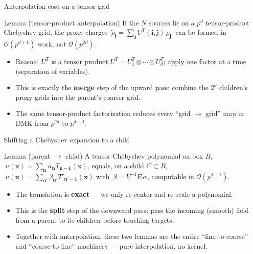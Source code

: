 \documentclass[aspectratio=169,11pt]{beamer}
\newcommand{\cO}{\mathcal{O}}
\newcommand{\x}{\bm{x}}
\newcommand{\hl}[1]{{\color{CCMorange}\textbf{#1}}}
\begin{document}
\begin{frame}{Anterpolation cost on a tensor grid}
\small
\begin{block}{Lemma (tensor-product anterpolation)}
If the \(N\) sources lie on a \(p^d\) tensor-product Chebyshev grid, the proxy charges
\(\ \tilde\rho_{\bm i}=\sum_{\bm j} U^{T}(\bm i,\bm j)\,\rho_{\bm j}\ \)
can be formed in \(\cO(p^{d+1})\) work, not \(\cO(p^{2d})\).
\end{block}
\begin{itemize}
  \item Reason: \(U^T\) is a tensor product \(U^T=U_1^T\otimes\cdots\otimes U_d^T\); apply one factor at a time (separation of variables).
  \item This is exactly the \hl{merge} step of the upward pass: combine the \(2^d\) children's proxy grids into the parent's coarser grid.
  \item The same tensor-product factorization reduces every ``grid \(\to\) grid'' map in DMK from \(p^{2d}\) to \(p^{d+1}\).
\end{itemize}
\end{frame}

\begin{frame}{Shifting a Chebyshev expansion to a child}
\small
\begin{block}{Lemma (parent \(\to\) child)}
A tensor Chebyshev polynomial on box \(B\), \(\ u(\x)=\sum_{\bm n}\alpha_{\bm n}T_{\bm n-\bm1}(\x)\), equals, on a child \(C\subset B\), \(\ u(\x)=\sum_{\bm n'}\beta_{\bm n'}T'_{\bm n'-\bm1}(\x)\) with
\(\ \beta=V^{-1}E\,\alpha\), computable in \(\cO(p^{d+1})\).
\end{block}
\begin{itemize}
  \item The translation is \hl{exact} --- we only re-center and re-scale a polynomial.
  \item This is the \hl{split} step of the downward pass: pass the incoming (smooth) field from a parent to its children before touching targets.
  \item Together with anterpolation, these two lemmas are the entire ``fine-to-coarse'' and ``coarse-to-fine'' machinery --- pure interpolation, no kernel.
\end{itemize}
\end{frame}
\end{document}
